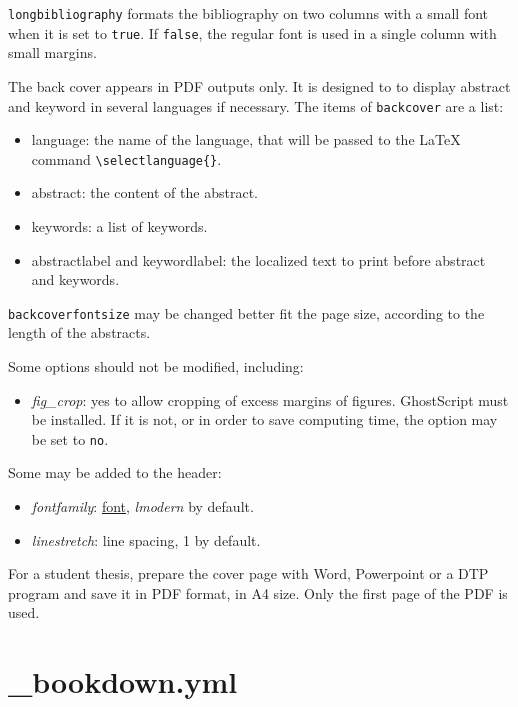 \documentclass[
  12pt,
  american,
  a4paper,
  extrafontsizes,onecolumn,openright
  ]{memoir}
\providecommand{\tightlist}{%
  \setlength{\itemsep}{0pt}\setlength{\parskip}{0pt}}
\newlength{\rf}
\begin{document}
\texttt{longbibliography} formats the bibliography on two columns with a small font when it is set to \texttt{true}.
If \texttt{false}, the regular font is used in a single column with small margins.

The back cover appears in PDF outputs only.
It is designed to to display abstract and keyword in several languages if necessary.
The items of \texttt{backcover} are a list:

\begin{itemize}
\tightlist
\item
  language: the name of the language, that will be passed to the LaTeX command \texttt{\textbackslash{}selectlanguage\{\}}.
\item
  abstract: the content of the abstract.
\item
  keywords: a list of keywords.
\item
  abstractlabel and keywordlabel: the localized text to print before abstract and keywords.
\end{itemize}

\texttt{backcoverfontsize} may be changed better fit the page size, according to the length of the abstracts.

Some options should not be modified, including:

\begin{itemize}
\tightlist
\item
  \emph{fig\_crop}: yes to allow cropping of excess margins of figures.
  GhostScript must be installed.
  If it is not, or in order to save computing time, the option may be set to \texttt{no}.
\end{itemize}

Some may be added to the header:

\begin{itemize}
\tightlist
\item
  \emph{fontfamily}: \href{https://en.wikibooks.org/wiki/LaTeX/Fonts\#Font_families}{font}, \emph{lmodern} by default.
\item
  \emph{linestretch}: line spacing, 1 by default.
\end{itemize}

For a student thesis, prepare the cover page with Word, Powerpoint or a DTP program and save it in PDF format, in A4 size.
Only the first page of the PDF is used.

\section{\_bookdown.yml}\label{bookdown.yml}
\end{document}
